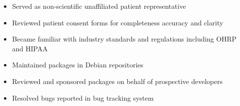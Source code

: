 
\begin{itemize}
    \item Served as non-scientific unaffiliated patient representative
    \item Reviewed patient consent forms for completeness accuracy and clarity
    \item Became familiar with industry standards and regulations including OHRP and HIPAA
\end{itemize}

\vspace{4pt}

\begin{itemize}
    \item Maintained packages in Debian repositories
    \item Reviewed and sponsored packages on behalf of prospective developers
    \item Resolved bugs reported in bug tracking system
\end{itemize}

\vspace{6pt}